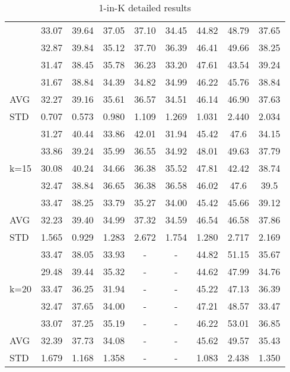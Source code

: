 \begin{table*}[t]
{\begin{tabular}{l|ccccc|ccc}
&33.07&	39.64&	37.05&	37.10&	34.45&	44.82&	48.79&	37.65\\
&32.87&	39.84&	35.12&	37.70&	36.39&	46.41&	49.66&	38.25\\
&31.47&	38.45&	35.78&	36.23&	33.20&	47.61&	43.54&	39.24\\
&31.67&	38.84&	34.39&	34.82&	34.99&	46.22&	45.76&	38.84\\
\midrule
AVG&32.27&	39.16&	35.61&	36.57&	34.51&	46.14&	46.90&	37.63\\
STD&0.707&	0.573&	0.980&	1.109&	1.269&	1.031&	2.440&	2.034\\
\midrule
\multirow{5}{*}{k=15}&31.27&	40.44&	33.86&	42.01&	31.94&	45.42&	47.6&	34.15\\
&33.86&	39.24&	35.99&	36.55&	34.92&	48.01&	49.63&	37.79\\
&30.08&	40.24&	34.66&	36.38&	35.52&	47.81&	42.42&	38.74\\
&32.47&	38.84&	36.65&	36.38&	36.58&	46.02&	47.6&	39.5\\
&33.47&	38.25&	33.79&	35.27&	34.00&	45.42&	45.66&	39.12\\
\midrule
AVG&32.23&	39.40&	34.99&	37.32&	34.59&	46.54&	46.58&	37.86\\
STD&1.565&	0.929&	1.283&	2.672&	1.754&	1.280&	2.717&	2.169\\
\midrule
\multirow{5}{*}{k=20}&33.47&	38.05&	33.93&	-&	-&	44.82&	51.15&	35.67\\
&29.48&	39.44&	35.32&	-&	-&	44.62&	47.99&	34.76\\
&33.47&	36.25&	31.94&	-&	-&	45.22&	47.13&	36.39\\
&32.47&	37.65&	34.00&	-&	-&	47.21&	48.57&	33.47\\
&33.07&	37.25&	35.19&	-&	-&	46.22&	53.01&	36.85\\
\midrule
AVG&32.39&	37.73&	34.08&	-&	-&	45.62&	49.57&	35.43\\
STD&1.679&	1.168&	1.358&	-&	-&	1.083&	2.438&	1.350\\
\bottomrule
    \end{tabular}}
    \caption{1-in-K detailed results}
    \label{tab:1ink_detail}
\end{table*}


